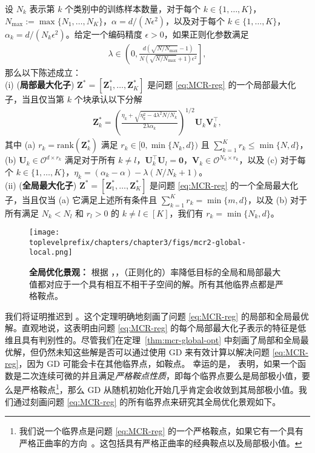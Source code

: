 \documentclass[../../book-main.tex]{subfiles}
\begin{document}
\begin{theorem}[\bf 局部和全局最优解]\label{thm:mcr-global-opt}
	设 $N_k$ 表示第 $k$ 个类别中的训练样本数量，对于每个 $k \in \{1,\dots,K\}$，$N_{\max} := \max\{N_1,\dots,N_K\}$，$\alpha=d/(N\epsilon^2)$，以及对于每个 $k \in \{1,\dots,K\}$，$\alpha_{k} = d/(N_k\epsilon^2)$。给定一个编码精度 $\epsilon > 0$，如果正则化参数满足
	\begin{align}\label{eq:lambda}
		\lambda \in \left(0, \frac{d(\sqrt{N/N_{\max}}-1)}{N(\sqrt{N/N_{\max}}+1)\epsilon^2} \right],
	\end{align}
	那么以下陈述成立：\\
	(i) ({\bf 局部最大化子}) $\bm Z^* = \left[\bm Z_1^*,\dots,\bm Z_K^* \right]$ 是问题 \eqref{eq:MCR-reg} 的一个局部最大化子，当且仅当第 $k$ 个块承认以下分解
	\begin{align}\label{eq:Zk opti}
		\bm Z_k^* = \left(\frac{ \eta_k + \sqrt{\eta_k^2 - 4\lambda^2N/N_k}}{2\lambda \alpha_{k}}\right)^{1/2} \bm U_k \bm V_k^\top,
	\end{align}
	其中 (a) $r_k = \mathrm{rank}(\bm Z_k^*)$ 满足 $r_k \in [0,\min\{N_k,d\})$ 且 $\sum_{k=1}^K r_k \le \min\{N,d\}$，(b) $\bm U_k \in \mathcal{O}^{d \times r_k}$ 满足对于所有 $k \neq l$，$\bm U_k^{\top}\bm U_l = \bm 0$，$\bm V_k \in \mathcal{O}^{N_k \times r_k}$，以及 (c) 对于每个 $k\in \{1,\dots,K\}$，$\eta_k=(\alpha_k-\alpha) - \lambda(N/N_k+1)$。
	\\
	(ii) ({\bf 全局最大化子}) $\bm Z^* = \left[\bm Z_1^*,\dots,\bm Z_K^* \right]$ 是问题 \eqref{eq:MCR-reg} 的一个全局最大化子，当且仅当 (a) 它满足上述所有条件且 $\sum_{k=1}^K r_k = \min\{m,d\}$，以及 (b) 对于所有满足 $N_k < N_l$ 和 $r_l > 0$ 的 $k \neq l \in [K]$，我们有 $r_k = \min\{N_k,d\}$。
\end{theorem}

\begin{figure}[t]
	\centering
	\texttt{[image: \\toplevelprefix/chapters/chapter3/figs/mcr2-global-local.png]}
	\caption{{\bf 全局优化景观：} 根据 \cite{sun2015nonconvex,lee2016gradient}，，（正则化的）率降低目标的全局和局部最大值都对应于一个具有相互不相干子空间的解。所有其他临界点都是严格鞍点。}
	\label{fig:mcr-global-local}
\end{figure}

我们将证明推迟到 \cite{wang2024global}。这个定理明确地刻画了问题 \eqref{eq:MCR-reg} 的局部和全局最优解。直观地说，这表明由问题 \eqref{eq:MCR-reg} 的每个局部最大化子表示的特征是低维且具有判别性的。尽管我们在定理~\ref{thm:mcr-global-opt} 中刻画了局部和全局最优解，但仍然未知这些解是否可以通过使用 GD 来有效计算以解决问题 \eqref{eq:MCR-reg}，因为 GD 可能会卡在其他临界点，如鞍点。
幸运的是，\cite{sun2015nonconvex,lee2016gradient} 表明，如果一个函数是二次连续可微的并且满足{\em 严格鞍点性质}，即每个临界点要么是局部极小值，要么是严格鞍点\footnote{我们说一个临界点是问题 \eqref{eq:MCR-reg} 的一个严格鞍点，如果它有一个具有严格正曲率的方向~\cite{sun2015nonconvex}。这包括具有严格正曲率的经典鞍点以及局部极小值。}，那么 GD 从随机初始化开始几乎肯定会收敛到其局部极小值。我们通过刻画问题 \eqref{eq:MCR-reg} 的所有临界点来研究其全局优化景观如下。
\end{document}
